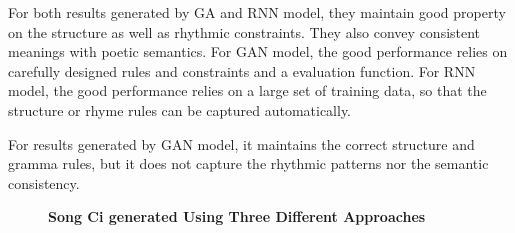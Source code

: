 For both results generated by GA and RNN model, they maintain good property on the structure as well as rhythmic constraints. %
They also convey consistent meanings with poetic semantics. For GAN model, the good performance relies on carefully designed rules and constraints and a evaluation function. 
%
For RNN model, the good performance relies on a large set of training data, so that the structure or rhyme rules can be captured automatically.

For results generated by GAN model, it maintains the correct structure and gramma rules, but it does not capture the rhythmic patterns nor the semantic consistency.

 \begin{figure}[ht]
\begin{minipage}[t]{1.1\linewidth}
\centering 
{}
 
 
\caption{\textbf{Song Ci generated Using Three Different Approaches}}
\label{fig:songci}
\end{minipage}
\end{figure}


 